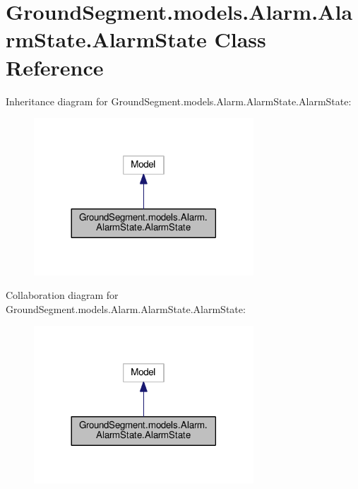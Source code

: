 \hypertarget{class_ground_segment_1_1models_1_1_alarm_1_1_alarm_state_1_1_alarm_state}{}\section{Ground\+Segment.\+models.\+Alarm.\+Alarm\+State.\+Alarm\+State Class Reference}
\label{class_ground_segment_1_1models_1_1_alarm_1_1_alarm_state_1_1_alarm_state}


Inheritance diagram for Ground\+Segment.\+models.\+Alarm.\+Alarm\+State.\+Alarm\+State\+:\nopagebreak
\begin{figure}[H]
\begin{center}
\leavevmode
\includegraphics[width=233pt]{class_ground_segment_1_1models_1_1_alarm_1_1_alarm_state_1_1_alarm_state__inherit__graph}
\end{center}
\end{figure}


Collaboration diagram for Ground\+Segment.\+models.\+Alarm.\+Alarm\+State.\+Alarm\+State\+:\nopagebreak
\begin{figure}[H]
\begin{center}
\leavevmode
\includegraphics[width=233pt]{class_ground_segment_1_1models_1_1_alarm_1_1_alarm_state_1_1_alarm_state__coll__graph}
\end{center}
\end{figure}
